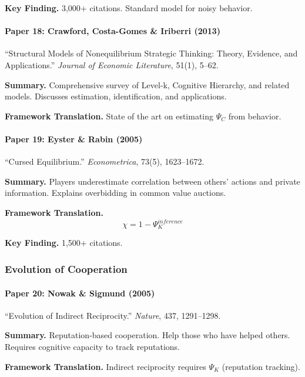 \textbf{Key Finding.}
3,000+ citations. Standard model for noisy behavior.

\paragraph{Paper 18: Crawford, Costa-Gomes \& Iriberri (2013)}

``Structural Models of Nonequilibrium Strategic Thinking: Theory, Evidence, and Applications.''
\textit{Journal of Economic Literature}, 51(1), 5--62.

\textbf{Summary.}
Comprehensive survey of Level-k, Cognitive Hierarchy, and related models.
Discusses estimation, identification, and applications.

\textbf{Framework Translation.}
State of the art on estimating $\Psi_C$ from behavior.

\paragraph{Paper 19: Eyster \& Rabin (2005)}

``Cursed Equilibrium.''
\textit{Econometrica}, 73(5), 1623--1672.

\textbf{Summary.}
Players underestimate correlation between others' actions and private 
information. Explains overbidding in common value auctions.

\textbf{Framework Translation.}
\begin{equation}
\chi = 1 - \Psi_K^{inference}
\end{equation}

\textbf{Key Finding.}
1,500+ citations.

\subsubsection{Evolution of Cooperation}

\paragraph{Paper 20: Nowak \& Sigmund (2005)}

``Evolution of Indirect Reciprocity.''
\textit{Nature}, 437, 1291--1298.

\textbf{Summary.}
Reputation-based cooperation. Help those who have helped others.
Requires cognitive capacity to track reputations.

\textbf{Framework Translation.}
Indirect reciprocity requires $\Psi_K$ (reputation tracking).

